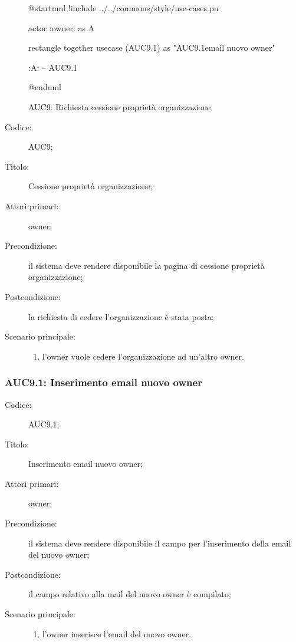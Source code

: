 \documentclass[../../../analisi-dei-requisiti.tex]{subfiles}
\begin{document}
\begin{figure}[H]
  \centering
  \begin{plantuml}
  @startuml
  !include ../../commons/style/use-cases.pu

  actor :owner: as A

  rectangle {
    together {
      usecase (AUC9.1) as "AUC9.1\nInserimento email nuovo owner"
    }
  }

  :A: -- AUC9.1

  @enduml
  \end{plantuml}
  \caption{AUC9: Richiesta cessione proprietà organizzazione}%
  \label{fig:auc9}
\end{figure}

\begin{description}
  \item[Codice:] AUC9;
  \item[Titolo:] Cessione proprietà organizzazione;
  \item[Attori primari:] owner;
  \item[Precondizione:] il sistema deve rendere disponibile la pagina di cessione proprietà organizzazione;
  \item[Postcondizione:] la richiesta di cedere l'organizzazione è stata posta;
  \item[Scenario principale:]
  \begin{enumerate}
    \item l'owner vuole cedere l'organizzazione ad un'altro owner.
  \end{enumerate}
\end{description}

\subsubsection{AUC9.1: Inserimento email nuovo owner}%
\label{subs:AUC9.1}
\begin{description}
  \item[Codice:] AUC9.1;
  \item[Titolo:] Inserimento email nuovo owner;
  \item[Attori primari:] owner;
  \item[Precondizione:] il sistema deve rendere disponibile il campo per l'inserimento della email del nuovo owner;
  \item[Postcondizione:] il campo relativo alla mail del nuovo owner è compilato;
  \item[Scenario principale:]
  \begin{enumerate}
    \item l'owner inserisce l'email del nuovo owner.
  \end{enumerate}
\end{description}
\end{document}
